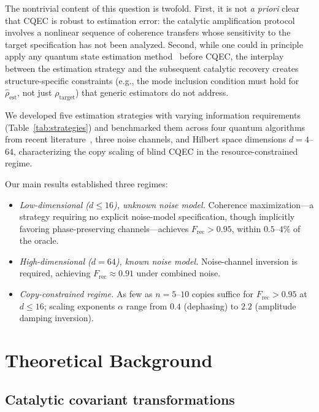 \documentclass[prx,twocolumn,superscriptaddress,longbibliography,floatfix]{revtex4-2}
\newcommand{\Frec}{F_\mathrm{rec}}
\newcommand{\rhot}{\rho_\mathrm{target}}
\newcommand{\rhoe}{\hat{\rho}_\mathrm{est}}
\begin{document}
The nontrivial content of this question is twofold.
First, it is not \emph{a priori} clear that CQEC is robust to estimation error: the catalytic amplification protocol involves a nonlinear sequence of coherence transfers whose sensitivity to the target specification has not been analyzed.
Second, while one could in principle apply any quantum state estimation method~\cite{Hradil1997,Gross2010,Haah2017} before CQEC, the interplay between the estimation strategy and the subsequent catalytic recovery creates structure-specific constraints (e.g., the mode inclusion condition must hold for $\rhoe$, not just $\rhot$) that generic estimators do not address.

We developed five estimation strategies with varying information requirements (Table~\ref{tab:strategies}) and benchmarked them across four quantum algorithms from recent literature~\cite{Chen2021,Ivashkov2024,Clinton2026,Regev2024}, three noise channels, and Hilbert space dimensions $d = 4$--$64$, characterizing the copy scaling of blind CQEC in the resource-constrained regime.

Our main results established three regimes:
\begin{itemize}
\item \emph{Low-dimensional ($d \leq 16$), unknown noise model.} Coherence maximization---a strategy requiring no explicit noise-model specification, though implicitly favoring phase-preserving channels---achieves $\Frec > 0.95$, within $0.5$--$4\%$ of the oracle.
\item \emph{High-dimensional ($d = 64$), known noise model.} Noise-channel inversion is required, achieving $\Frec \approx 0.91$ under combined noise.
\item \emph{Copy-constrained regime.} As few as $n = 5$--$10$ copies suffice for $\Frec > 0.95$ at $d \leq 16$; scaling exponents $\alpha$ range from $0.4$ (dephasing) to $2.2$ (amplitude damping inversion).
\end{itemize}


\section{Theoretical Background}
\label{sec:theory}

\subsection{Catalytic covariant transformations}
\label{sec:catalytic}
\end{document}

